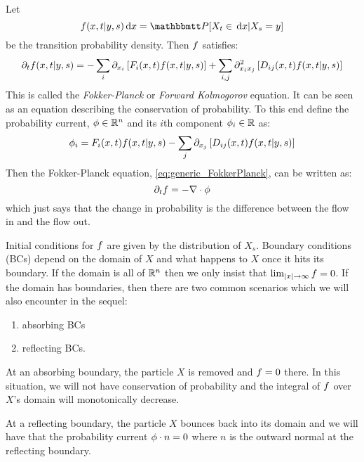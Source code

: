 Let 
\begin{equation}
 \f(x,t| y,s) \intd{x} =  \Prob[X_t \in \intd{x} | X_s = y]
 \label{eq:transition_prob_defn} 
 \end{equation}
be the transition probability density. Then ${f}$ satisfies:
\begin{equation}
{\partial}_t {f}(x,t| y,s)= -\sum_i {\partial}_{x_i} \left[ F_i(x,t) {f}(x,t| y,s) \right] 
+ 
\sum_{i,j}  {\partial}^2_{x_i x_j} \left[ D_{ij}(x,t) {f}(x,t| y,s) \right]
\label{eq:generic_FokkerPlanck}
\end{equation} 
This is called the \emph{Fokker-Planck} or \emph{Forward Kolmogorov} equation.
It can be seen as an equation describing the conservation of probability. To this end define the
probability current, ${ \phi } \in { \mathbb{R} }^n$ and its $i$th component $\phi_i \in { \mathbb{R} }$ as:
\begin{equation}
\phi_i =   F_i(x,t) {f}(x,t| y,s) 
- \sum_{j}  {\partial}_{x_j} \left[ D_{ij}(x,t) {f}(x,t| y,s)\right]
\label{eq:FokkerPlanck_prob_flux}
\end{equation}
Then the Fokker-Planck equation, \cref{eq:generic_FokkerPlanck}, can be written as:
\begin{equation}
{\partial}_t {f}= -{ \nabla } \cdot \phi
\label{eq:Fokker_planck_as_prob_flux}
\end{equation}
which just says that the change in probability is the
difference between the flow in and the flow out. 

Initial conditions for ${f}$ are given by the distribution of $X_s$. 
Boundary conditions (BCs) depend
on the domain of $X$ and what happens to $X$ once it hits its boundary. If the domain
is all of ${ \mathbb{R} }^n$ then we only insist that $\lim_{|x| {\rightarrow} \infty} {f} = 0$. If the
domain has boundaries, then there are two common scenarios which we will also
encounter in the sequel:
\begin{enumerate}  
  \item absorbing BCs
  \item reflecting BCs.
\end{enumerate}
At an absorbing boundary, the particle $X$ is removed and ${f}=0$ there.
In this situation, we will not have conservation of probability and the integral
of ${f}$ over $X$'s domain will monotonically decrease.

At a reflecting boundary, the particle $X$ bounces back into its domain and we
will have that the probability current ${ \phi }\cdot n = 0$ where $n$ is the outward
normal at the reflecting boundary.

